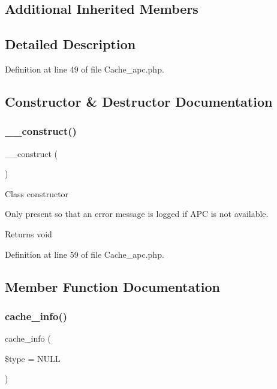 \subsection*{Additional Inherited Members}


\subsection{Detailed Description}


Definition at line 49 of file Cache\+\_\+apc.\+php.



\subsection{Constructor \& Destructor Documentation}
\mbox{\label{class_c_i___cache__apc_a095c5d389db211932136b53f25f39685}} 
\subsubsection{\texorpdfstring{\_\_construct()}{\_\_construct()}}
{\footnotesize\ttfamily \+\_\+\+\_\+construct (\begin{DoxyParamCaption}{ }\end{DoxyParamCaption})}

Class constructor

Only present so that an error message is logged if A\+PC is not available.

\begin{DoxyReturn}{Returns}
void 
\end{DoxyReturn}


Definition at line 59 of file Cache\+\_\+apc.\+php.



\subsection{Member Function Documentation}
\mbox{\label{class_c_i___cache__apc_aa8b9c4d9f0387156736ccd8850f0727e}} 
\subsubsection{\texorpdfstring{cache\_info()}{cache\_info()}}
{\footnotesize\ttfamily cache\+\_\+info (\begin{DoxyParamCaption}\item[{}]{\$type = {\ttfamily NULL} }\end{DoxyParamCaption})}

